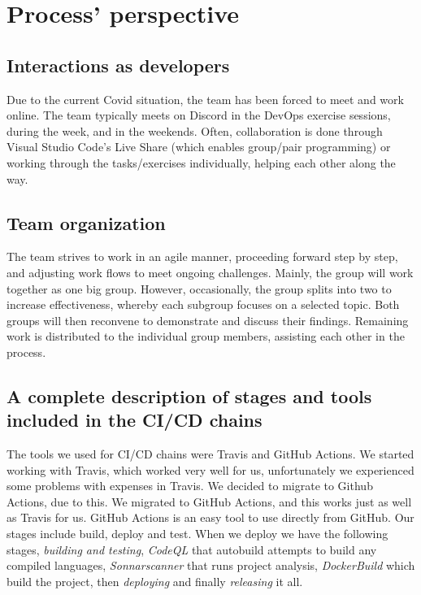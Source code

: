 \section{Process' perspective}

\subsection{Interactions as developers}
  Due to the current Covid situation, the team has been forced to meet and work online. The team typically meets on Discord in the DevOps
  exercise sessions, during the week, and in the weekends. Often, collaboration is done through Visual Studio Code's Live Share (which enables group/pair programming) or working through the tasks/exercises individually, helping each other along the way. 
  \newline
 
\subsection{Team organization}
  The team strives to work in an agile manner, proceeding forward step by step, and adjusting work flows to meet ongoing challenges. Mainly, the group will work together as one big group. 
  However, occasionally, the group splits into two to increase effectiveness, whereby each subgroup focuses on a selected topic. Both groups will then reconvene to demonstrate and discuss their findings. Remaining work is distributed to the individual group members, assisting each other in the process.

\subsection{A complete description of stages and tools included in the CI/CD chains}
The tools we used for CI/CD chains were Travis and GitHub Actions. We started working with Travis, which worked very well for us, unfortunately we experienced some problems with expenses in Travis. We decided to migrate to Github Actions, due to this.
We migrated to GitHub Actions, and this works just as well as Travis for us. GitHub Actions is an easy tool to use directly from GitHub. 
Our stages include build, deploy and test. When we deploy we have the following stages, \textit{building and testing}, \textit{CodeQL} that autobuild attempts to build any compiled languages, \textit{Sonnarscanner} that runs project analysis, \textit{DockerBuild} which build the project, then \textit{deploying} and finally \textit{releasing} it all.\newline
 
